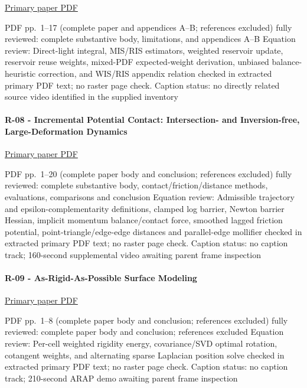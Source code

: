\href{https://benedikt-bitterli.me/restir/bitterli20restir.pdf}{Primary paper PDF}

PDF pp.~1--17 (complete paper and appendices A--B; references excluded) fully reviewed: complete substantive body, limitations, and appendices A--B Equation review: Direct-light integral, MIS/RIS estimators, weighted reservoir update, reservoir reuse weights, mixed-PDF expected-weight derivation, unbiased balance-heuristic correction, and WIS/RIS appendix relation checked in extracted primary PDF text; no raster page check. Caption status: no directly related source video identified in the supplied inventory

\paragraph{R-08 - Incremental Potential Contact: Intersection- and Inversion-free, Large-Deformation Dynamics}\label{r-08---incremental-potential-contact-intersection--and-inversion-free-large-deformation-dynamics}

\href{https://ipc-sim.github.io/file/IPC-paper-350ppi.pdf}{Primary paper PDF}

PDF pp.~1--20 (complete paper body and conclusion; references excluded) fully reviewed: complete substantive body, contact/friction/distance methods, evaluations, comparisons and conclusion Equation review: Admissible trajectory and epsilon-complementarity definitions, clamped log barrier, Newton barrier Hessian, implicit momentum balance/contact force, smoothed lagged friction potential, point-triangle/edge-edge distances and parallel-edge mollifier checked in extracted primary PDF text; no raster page check. Caption status: no caption track; 160-second supplemental video awaiting parent frame inspection

\paragraph{R-09 - As-Rigid-As-Possible Surface Modeling}\label{r-09---as-rigid-as-possible-surface-modeling}

\href{https://igl.ethz.ch/projects/ARAP/arap_web.pdf}{Primary paper PDF}

PDF pp.~1--8 (complete paper body and conclusion; references excluded) fully reviewed: complete paper body and conclusion; references excluded Equation review: Per-cell weighted rigidity energy, covariance/SVD optimal rotation, cotangent weights, and alternating sparse Laplacian position solve checked in extracted primary PDF text; no raster page check. Caption status: no caption track; 210-second ARAP demo awaiting parent frame inspection


